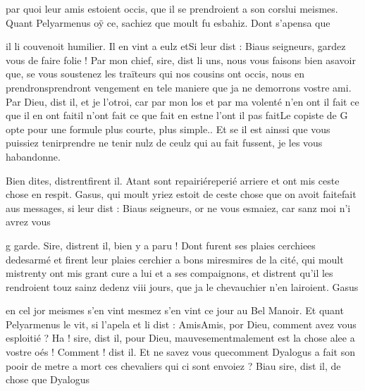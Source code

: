 \documentclass{article}
\begin{document}
\begin{pages}
                  par quoi leur amis estoient occis, que il se prendroient a 
                  son corslui meismes. \pend
            \pstart Quant Pelyarmenus oÿ ce, sachiez que moult fu esbahiz. Dont s’apensa que
                  
                     il li couvenoit humilier. 
                  Il en vint a eulz etSi leur dist : Biaus seigneurs, gardez vous de
                  faire folie !
               Par mon chief, sire, dist li uns, nous vous faisons
                  bien asavoir que, se vous soustenez les traïteurs qui nos cousins ont occis, nous
                  en 
                     prendronsprendront vengement en tele maniere que ja ne demorrons vostre ami.
               Par Dieu, dist il, et je l’otroi, car par mon los et
                  par ma volenté 
                     n’en ont il fait ce que il en ont faitil n'ont fait ce que fait en estne l'ont il pas faitLe copiste de G opte pour une formule plus courte,
                     plus simple.. Et se il est ainssi que vous puissiez 
                     tenirprendre ne tenir nulz de ceulz qui au fait fussent, je les vous habandonne.
               
                  Bien dites, 
                        distrentfirent il. Atant 
                  sont 
                        repairiéreperié arriere et ont mis ceste chose en respit. Gasus, qui
               moult yriez estoit de ceste chose que on avoit 
                  faitefait aus messages, si leur dist : Biaus seigneurs,
                  or ne vous esmaiez, car sanz moi n’i avrez vous 
                     
                     
                        g
                      garde.
               Sire, distrent il, bien y a paru !
               Dont furent 
                  ses plaies cerchiees dedesarmé et firent leur plaies cerchier a bons 
                  miresmires de la cité, qui moult 
                  mistrenty ont mis grant cure 
                  a lui et a ses compaignons, et distrent qu’il les rendroient touz sainz dedenz viii jours, que
               ja le chevauchier n’en lairoient. Gasus
               
                  en cel jor meismes s’en vint mesmez s'en vint ce jour au Bel Manoir. Et quant Pelyarmenus le vit, si l’apela et 
                  li dist : 
                     AmisAmis, por Dieu, comment avez vous esploitié ?
               Ha ! sire, dist il, pour Dieu, 
                     mauvesementmalement est la chose alee a vostre oés !
               Comment ! 
                     dist il.
                Et ne savez vous 
                     quecomment
                  Dyalogus a fait son pooir de metre a mort ces
                  chevaliers qui 
                     ci sont envoiez ?
               Biau sire, dist il, de chose que Dyalogus
                  

\end{pages}
\end{document}
